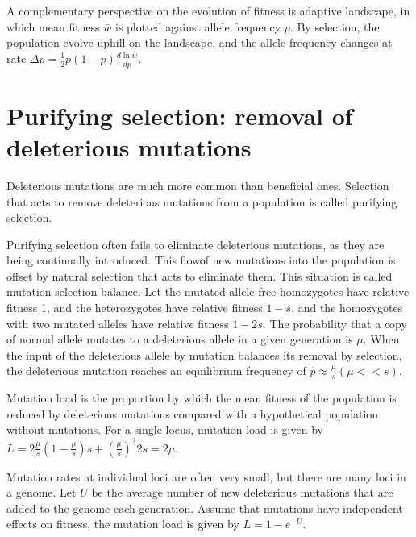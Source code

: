 \documentclass[11pt]{article}
\begin{document}
\begin{sloppypar}
\par

A complementary perspective on the evolution of fitness is adaptive landscape, in which mean fitness $\bar{w}$ is plotted against allele frequency $p$. 
By selection, the population evolve uphill on the landscape, and the allele frequency changes at rate $\Delta p=\frac{1}{2}p(1-p) \frac{d \ln \bar{w} }{d p}$. 

\section{Purifying selection: removal of deleterious mutations}
Deleterious mutations are much more common than beneficial ones. 
Selection that acts to remove deleterious mutations from a population is called purifying selection. 

\par

Purifying selection often fails to eliminate deleterious mutations, as they are being continually introduced. 
This flowof new mutations into the population is offset by natural selection that acts to eliminate them. 
This situation is called mutation-selection balance. 
Let the mutated-allele free homozygotes have relative fitness 1, and the heterozygotes have relative fitness $1-s$, and the homozygotes with two mutated alleles have relative fitness $1-2s$. 
The probability that a copy of normal allele mutates to a deleterious allele in a given generation is $\mu$. 
When the input of the deleterious allele by mutation balances its removal by selection, the deleterious mutation reaches an equilibrium frequency of $\hat{p} \approx \frac{\mu}{s} (\mu << s)$. 

\par

Mutation load is the proportion by which the mean fitness of the population is reduced by deleterious mutations compared with a hypothetical population without mutations. 
For a single locus, mutation load is given by $L=2\frac{\mu}{s}(1-\frac{\mu}{s})s+(\frac{\mu}{s})^2 2s = 2\mu$. 

\par

Mutation rates at individual loci are often very small, but there are many loci in a genome. 
Let $U$ be the average number of new deleterious mutations that are added to the genome each generation. 
Assume that mutations have independent effects on fitness, the mutation load is given by $L=1-e^{-U}$.


  
\end{sloppypar}
\end{document}
